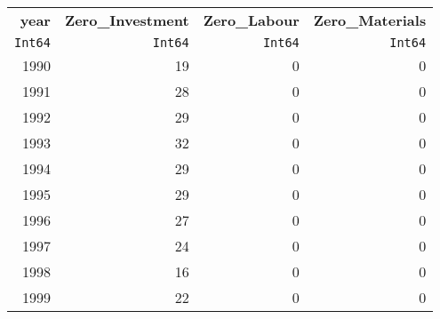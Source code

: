 \begin{tabular}{rrrr}
  \hline
  \textbf{year} & \textbf{Zero\_Investment} & \textbf{Zero\_Labour} & \textbf{Zero\_Materials} \\
  \texttt{Int64} & \texttt{Int64} & \texttt{Int64} & \texttt{Int64} \\\hline
  1990 & 19 & 0 & 0 \\
  1991 & 28 & 0 & 0 \\
  1992 & 29 & 0 & 0 \\
  1993 & 32 & 0 & 0 \\
  1994 & 29 & 0 & 0 \\
  1995 & 29 & 0 & 0 \\
  1996 & 27 & 0 & 0 \\
  1997 & 24 & 0 & 0 \\
  1998 & 16 & 0 & 0 \\
  1999 & 22 & 0 & 0 \\\hline
\end{tabular}
